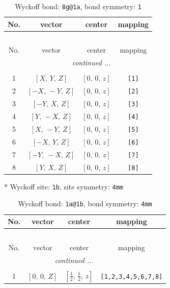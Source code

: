 \documentclass[fleqn,8pt]{jsarticle}
\begin{document}
\renewcommand{\arraystretch}{1.2}
\begin{longtable}{cccc}
\caption{Wyckoff bond: {\tt 8g@1a}, bond symmetry: {\tt 1}}
 \\
 \hline \hline
No. & vector & center & mapping \\ \hline \endfirsthead

\multicolumn{3}{l}{\tablename\ \thetable{}} \\
 \hline \hline
No. & vector & center & mapping \\ \hline \endhead

 \hline \hline
\multicolumn{3}{r}{\footnotesize\it continued ...} \\ \endfoot

 \hline \hline
\multicolumn{3}{r}{} \\ \endlastfoot

1 & $\left[ X,\, Y,\, Z \right]$ & $\left[ 0,\, 0,\, z \right]$ & {\tt [1]} \\ \hline
2 & $\left[ - X,\, - Y,\, Z \right]$ & $\left[ 0,\, 0,\, z \right]$ & {\tt [2]} \\ \hline
3 & $\left[ - Y,\, X,\, Z \right]$ & $\left[ 0,\, 0,\, z \right]$ & {\tt [3]} \\ \hline
4 & $\left[ Y,\, - X,\, Z \right]$ & $\left[ 0,\, 0,\, z \right]$ & {\tt [4]} \\ \hline
5 & $\left[ X,\, - Y,\, Z \right]$ & $\left[ 0,\, 0,\, z \right]$ & {\tt [5]} \\ \hline
6 & $\left[ - X,\, Y,\, Z \right]$ & $\left[ 0,\, 0,\, z \right]$ & {\tt [6]} \\ \hline
7 & $\left[ - Y,\, - X,\, Z \right]$ & $\left[ 0,\, 0,\, z \right]$ & {\tt [7]} \\ \hline
8 & $\left[ Y,\, X,\, Z \right]$ & $\left[ 0,\, 0,\, z \right]$ & {\tt [8]} \\
\end{longtable}
* Wyckoff site: {\tt 1b}, site symmetry: {\tt 4mm}
\renewcommand{\arraystretch}{1.2}
\begin{longtable}{cccc}
\caption{Wyckoff bond: {\tt 1a@1b}, bond symmetry: {\tt 4mm}}
 \\
 \hline \hline
No. & vector & center & mapping \\ \hline \endfirsthead

\multicolumn{3}{l}{\tablename\ \thetable{}} \\
 \hline \hline
No. & vector & center & mapping \\ \hline \endhead

 \hline \hline
\multicolumn{3}{r}{\footnotesize\it continued ...} \\ \endfoot

 \hline \hline
\multicolumn{3}{r}{} \\ \endlastfoot

1 & $\left[ 0,\, 0,\, Z \right]$ & $\left[ \frac{1}{2},\, \frac{1}{2},\, z \right]$ & {\tt [1,2,3,4,5,6,7,8]} \\
\end{longtable}
\end{document}
